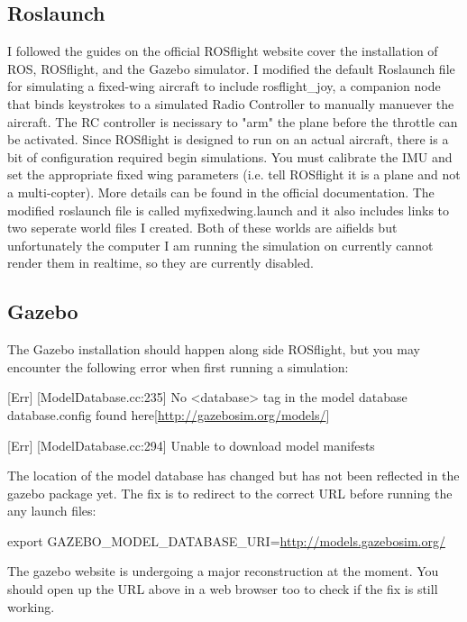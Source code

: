 \documentclass[11pt]{scrartcl} %
\begin{document}
\subsection{Roslaunch}
I followed the guides on the official ROSflight website cover the installation of ROS, ROSflight, and the Gazebo simulator. I modified the default Roslaunch file for simulating a fixed-wing aircraft to include rosflight\_joy, a companion node that binds keystrokes to a simulated Radio Controller to manually manuever the aircraft. The RC controller is necissary to "arm" the plane before the throttle can be activated. Since ROSflight is designed to run on an actual aircraft, there is a bit of configuration required begin simulations. You must calibrate the IMU and set the appropriate fixed wing parameters (i.e. tell ROSflight it is a plane and not a multi-copter). More details can be found in the official documentation. The modified roslaunch file is called myfixedwing.launch and it also includes links to two seperate world files I created. Both of these worlds are aifields but unfortunately the computer I am running the simulation on currently cannot render them in realtime, so they are currently disabled.

\subsection{Gazebo}
The Gazebo installation should happen along side ROSflight, but you may encounter the following error when first running a simulation: 

\small
\color{red}
[Err] [ModelDatabase.cc:235] No <database> tag in the model database database.config found here[\url{http://gazebosim.org/models/}]

[Err] [ModelDatabase.cc:294] Unable to download model manifests
\\
\color{black}
\normalsize

The location of the model database has changed but has not been reflected in the gazebo package yet. The fix is to redirect to the correct URL before running the any launch files:

\small
\color{green}
export GAZEBO\_MODEL\_DATABASE\_URI=\url{http://models.gazebosim.org/}
\\ \color{black}
\normalsize

The gazebo website is undergoing a major reconstruction at the moment. You should open up the URL above in a web browser too to check if the fix is still working.
\end{document}

